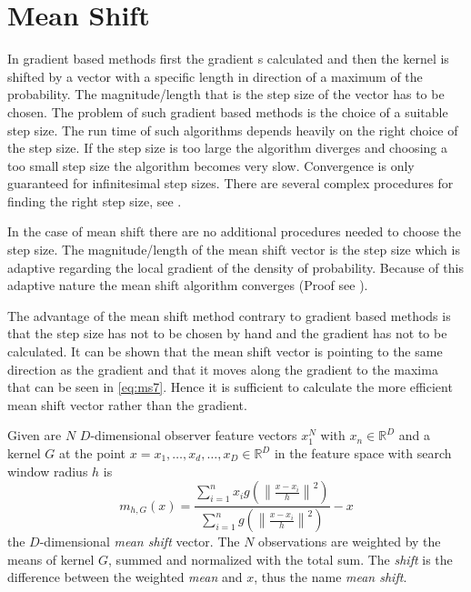 \section{Mean Shift} %
\label{sec:mean_shift}
In gradient based methods first the gradient s calculated and then the kernel is
shifted by a vector with a specific length in direction of a maximum of the 
probability. The magnitude/length that is the step size of the vector has to be
chosen. The problem of such gradient based methods is the choice of a suitable
step size. The run time of such algorithms depends heavily on the right choice
of the step size. If the step size is too large the algorithm diverges and 
choosing a too small step size the algorithm becomes very slow. Convergence is
only guaranteed for infinitesimal step sizes. There are several complex 
procedures for finding the right step size, see \citeauthor{citeulike:462300} 
\citep{citeulike:462300}.

In the case of mean shift there are no additional procedures needed to choose
the step size. The magnitude/length of the mean shift vector is the step size 
which is adaptive regarding the local gradient of the density of probability. 
Because of this adaptive nature the mean shift algorithm converges (Proof see 
\citeauthor{citeulike:462300} \citep{citeulike:462300}).

The advantage of the mean shift method contrary to gradient based methods is
that the step size has not to be chosen by hand and the gradient has not to be
calculated. It can be shown that the mean shift vector is pointing to the same
direction as the gradient and that it moves along the gradient to the maxima 
that can be seen in \autoref{eq:ms7}. Hence it is sufficient to calculate the
more efficient mean shift vector rather than the gradient. 

Given are $N$ $D$-dimensional observer feature vectors $x_1^N$ with $x_n \in
\mathbb{R}^D$ and a kernel $G$ at the point
$x = {x_1, \ldots , x_d, \ldots , x_D} \in \mathbb{R}^D$ in the feature space with 
search window radius $h$ is 
\begin{equation}\label{eq:ms0}
	m_{h,G}(x) = \frac{\sum_{i=1}^n x_i g\left(\left\lVert \frac{x - x_i}{h}
	\right\rVert^2\right)}{\sum_{i=1}^n g\left(\left\lVert \frac{x - x_i}{h}
	\right\rVert^2\right)} -x
\end{equation}
the $D$-dimensional \textit{mean shift} vector. The $N$ observations are
weighted by the means of kernel $G$, summed and normalized with the total sum.
The \emph{shift} is the difference between the weighted \emph{mean} and $x$, thus
the name \emph{mean shift}. 

